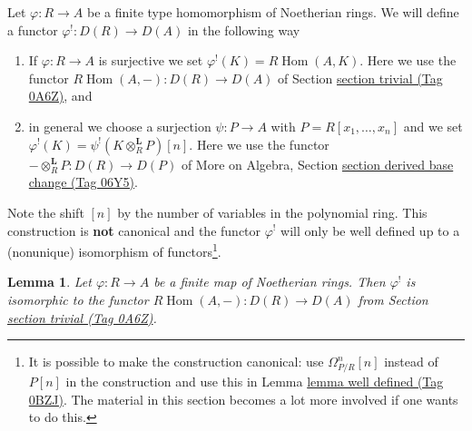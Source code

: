 \documentclass{amsart}
\theoremstyle{plain}
\newtheorem{lemma}[subsection]{Lemma}
\theoremstyle{definition}
\theoremstyle{remark}
\numberwithin{equation}{subsection}
\def\Hom{\mathop{\mathrm{Hom}}\nolimits}
\begin{document}
\medskip\noindent
Let $\varphi : R \to A$ be a finite type homomorphism of Noetherian rings.
We will define a functor $\varphi^! : D(R) \to D(A)$ in the following way
\begin{enumerate}
\item If $\varphi : R \to A$ is surjective we set
$\varphi^!(K) = R\Hom(A, K)$. Here we use the functor
$R\Hom(A, -) : D(R) \to D(A)$ of
Section \href{https://stacks.math.columbia.edu/tag/0A6Z}{section trivial (Tag 0A6Z)}, and
\item in general we choose a surjection $\psi : P \to A$ with
$P = R[x_1, \ldots, x_n]$ and we set
$\varphi^!(K) = \psi^!(K \otimes_R^\mathbf{L} P)[n]$.
Here we use the functor
$- \otimes_R^\mathbf{L} P : D(R) \to D(P)$
of More on Algebra, Section \href{https://stacks.math.columbia.edu/tag/06Y5}{section derived base change (Tag 06Y5)}.
\end{enumerate}
Note the shift $[n]$ by the number of variables in the polynomial
ring. This construction is {\bf not} canonical and the functor
$\varphi^!$ will only be well defined up to a (nonunique) isomorphism of
functors\footnote{It is possible to make the construction canonical:
use $\Omega^n_{P/R}[n]$ instead of $P[n]$ in the
construction and use this in Lemma \href{https://stacks.math.columbia.edu/tag/0BZJ}{lemma well defined (Tag 0BZJ)}.
The material in this section becomes a lot more involved
if one wants to do this.}.



\begin{lemma}
\label{lemma-upper-shriek-finite}
Let $\varphi : R \to A$ be a finite map of Noetherian rings.
Then $\varphi^!$ is isomorphic to the functor
$R\Hom(A, -) : D(R) \to D(A)$ from
Section \href{https://stacks.math.columbia.edu/tag/0A6Z}{section trivial (Tag 0A6Z)}.
\end{lemma}
\end{document}
